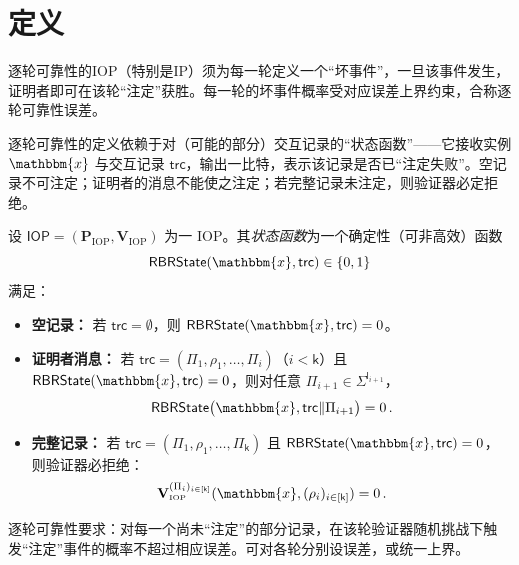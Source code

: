 \documentclass[american,singlepageview]{snargs-book-zh}
\newcommand{\concat}{\|}
\newcommand{\Instance}{\mathbbm{x}}
\newcommand{\ProtoProver}{P}
\newcommand{\ProtoVerifier}{V}
\newcommand{\ProtoAlphabet}{\Sigma}
\newcommand{\ProtoRoundComplexity}{\mathsf{k}}
\newcommand{\ProtoProofLength}{\mathsf{l}}
\newcommand{\RoundIndex}{i}
\newcommand{\IOPSymbol}{\mathsf{IOP}}
\newcommand{\IOPSubscript}{\scriptscriptstyle\mathrm{IOP}}
\newcommand{\IOPFormat}[1]{\mathbf{#1}}
\newcommand{\IOPProver}{\IOPFormat{\ProtoProver}_{\IOPSubscript}}
\newcommand{\IOPVerifier}{\IOPFormat{\ProtoVerifier}_{\IOPSubscript}}
\newcommand{\IOPSystem}{(\IOPProver,\IOPVerifier)}
\newcommand{\IOPString}{\Pi}
\newcommand{\IOPVerifierRandomMessage}{\rho}
\newcommand{\IOPRoundComplexity}{\ProtoRoundComplexity}
\newcommand{\IOPAlphabet}{\ProtoAlphabet}
\newcommand{\IOPProofLength}{\ProtoProofLength}
\newcommand{\IOPStrings}{(\IOPString_{\RoundIndex})_{\RoundIndex \in [\IOPRoundComplexity]}}
\newcommand{\IOPVerifierRandomMessages}{(\IOPVerifierRandomMessage_{\RoundIndex})_{\RoundIndex \in [\IOPRoundComplexity]}}
\newcommand{\IOPVerifierInput}{\Instance,\IOPVerifierRandomMessages}
\newcommand{\RBRState}{\mathsf{RBRState}}
\newcommand{\IOPEmptyTranscript}{\emptyset}
\newcommand{\IOPTranscriptSymbol}{\mathsf{trc}}
\begin{document}
\section{定义}
\label{section:rbr-definition}

逐轮可靠性的IOP（特别是IP）须为每一轮定义一个“坏事件”，一旦该事件发生，证明者即可在该轮“注定”获胜。每一轮的坏事件概率受对应误差上界约束，合称逐轮可靠性误差。

逐轮可靠性的定义依赖于对（可能的部分）交互记录的“状态函数”——它接收实例 $\Instance$ 与交互记录 $\IOPTranscriptSymbol$，输出一比特，表示该记录是否已“注定失败”。空记录不可注定；证明者的消息不能使之注定；若完整记录未注定，则验证器必定拒绝。

\begin{definition}
\label{def:iop-state}
设 $\IOPSymbol=\IOPSystem$ 为一 IOP。其\emph{状态函数}为一个确定性（可非高效）函数
\[
  \RBRState(\Instance,\IOPTranscriptSymbol)\in\{0,1\}
\]
满足：
\begin{itemize}[nolistsep]
  \item \textbf{空记录：} 若 $\IOPTranscriptSymbol=\IOPEmptyTranscript$，则 $\RBRState(\Instance,\IOPTranscriptSymbol)=0$。
  \item \textbf{证明者消息：} 若 $\IOPTranscriptSymbol=(\IOPString_{1},\IOPVerifierRandomMessage_{1},\dots,\IOPString_{\RoundIndex})$（$\RoundIndex<\IOPRoundComplexity$）且 $\RBRState(\Instance,\IOPTranscriptSymbol)=0$，则对任意 $\IOPString_{\RoundIndex+1}\in\IOPAlphabet^{\IOPProofLength_{\RoundIndex+1}}$，
  \[
    \RBRState\bigl(\Instance,\IOPTranscriptSymbol\concat\IOPString_{\RoundIndex+1}\bigr)=0\,. 
  \]
  \item \textbf{完整记录：} 若 $\IOPTranscriptSymbol=(\IOPString_{1},\IOPVerifierRandomMessage_{1},\dots,\IOPString_{\IOPRoundComplexity})$ 且 $\RBRState(\Instance,\IOPTranscriptSymbol)=0$，则验证器必拒绝：
  \[
    \IOPVerifier^{\IOPStrings}(\IOPVerifierInput)=0\,. 
  \]
\end{itemize}
\end{definition}

逐轮可靠性要求：对每一个尚未“注定”的部分记录，在该轮验证器随机挑战下触发“注定”事件的概率不超过相应误差。可对各轮分别设误差，或统一上界。
\end{document}
